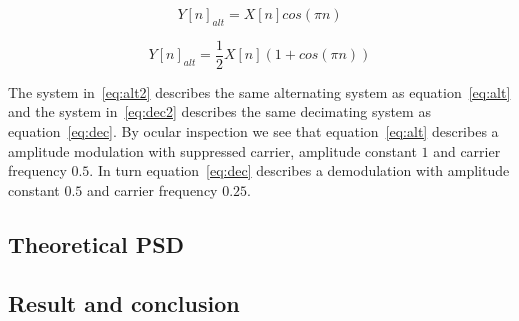 \documentclass[10pt]{article}
\begin{document}
\begin{equation}
  \label{eq:alt2}
  Y[n]_{alt} =X[n]cos(\pi n)
\end{equation}

\begin{equation}
  \label{eq:dec2}
  Y[n]_{alt} =\frac{1}{2}X[n](1+cos(\pi n))
\end{equation}

The system in~\ref{eq:alt2} describes the same alternating system as equation~\ref{eq:alt} and
the system in~\ref{eq:dec2} describes the same decimating system as equation~\ref{eq:dec}.
By ocular inspection we see that equation~\ref{eq:alt} describes a amplitude modulation with 
suppressed carrier, amplitude constant $1$ and carrier frequency $0.5$. In turn equation~\ref{eq:dec}
describes a demodulation with amplitude constant $0.5$ and carrier frequency $0.25$.

\subsection{Theoretical PSD}


\subsection{Result and conclusion}
\end{document}

